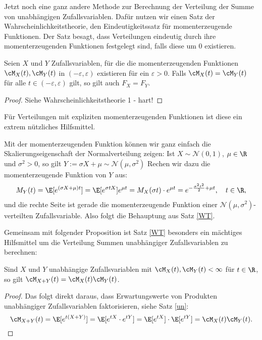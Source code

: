 Jetzt noch eine ganz andere Methode zur Berechnung der Verteilung der Summe von unabh\"angigen Zufallsvariablen. Daf\"ur nutzen wir einen Satz der Wahrscheinlichkeitstheorie, den Eindeutigkeitssatz f\"ur momenterzeugende Funktionen. Der Satz besagt, dass Verteilungen eindeutig durch ihre momenterzeugenden Funktionen festgelegt sind, falls diese um $0$ existieren.
\begin{satz}\label{WT}
	Seien $X$ und $Y$ Zufallsvariablen, f\"ur die die momenterzeugenden Funktionen $\cM_X(t),\cM_Y(t)$ in $(-\varepsilon,\varepsilon)$ existieren für ein $\varepsilon > 0$. Falls $\cM_X(t) = \cM_Y(t)$ für alle $t \in (-\varepsilon,\varepsilon)$ gilt, so gilt auch $F_X = F_Y$.
\end{satz}
\begin{proof}
	Siehe Wahrscheinlichkeitstheorie 1 - hart!
\end{proof}
F\"ur Verteilungen mit expliziten momenterzeugenden Funktionen ist diese ein extrem n\"utzliches Hilfsmittel. 
\begin{example}
	Mit der momenterzeugenden Funktion k\"onnen wir ganz einfach die Skalierungseigenschaft der Normalverteilung zeigen: Ist $X\sim \mathcal N(0,1)$, $\mu\in \R$ und $\sigma^2>0$, so gilt $Y:=\sigma X+\mu \sim \mathcal N(\mu,\sigma^2)$ Rechen wir dazu die momenterzeugende Funktion von $Y$ aus:
	\begin{align*}
		M_Y(t)=\E[e^{(\sigma X  + \mu)t}]=\E[e^{\sigma t X}]e^{\mu t}=M_{X}(\sigma t)\cdot e^{\mu t}= e^{-\frac{\sigma^2 t^2}{2}+\mu t},\quad t\in \R,
	\end{align*}
	und die rechte Seite ist gerade die momenterzeugende Funktion einer $\mathcal N(\mu, \sigma^2)$-verteilten Zufallsvariable. Also folgt die Behauptung aus Satz \ref{WT}.
\end{example}


Gemeinsam mit folgender Proposition ist Satz \ref{WT} besonders ein m\"achtiges Hilfsmittel um die Verteilung Summen unabh\"angiger Zufallsvariablen zu berechnen:
\begin{prop}\label{P7}
	Sind $X$ und $Y$ unabhängige Zufallsvariablen mit $\cM_X(t),\cM_Y(t) < \infty$ f\"ur $t\in\R$, so gilt $\cM_{X+Y}(t) = \cM_X(t)\cM_Y(t)$.
\end{prop}

\begin{proof} 
Das folgt direkt daraus, dass Erwartungswerte von Produkten unabh\"angiger Zufallsvariablen faktorisieren, siehe Satz \ref{un}:
	$$\cM_{X+Y}(t) = \E[e^{t(X+Y)}] = \E[e^{tX}\cdot e^{tY}] = \E[e^{tX}] \cdot \E[e^{tY}] = \cM_X(t)\cM_Y(t).$$
\end{proof}

